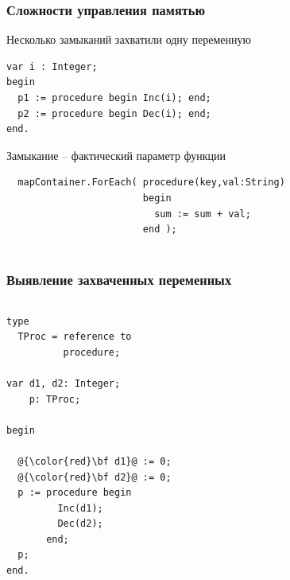 \documentclass[roman,12pt]{beamer}
\begin{document}
\begin{frame}[fragile]
  \frametitle{Сложности управления памятью}
 \begin{block}{Несколько замыканий захватили одну переменную}
   \begin{lstlisting}
var i : Integer;
begin
  p1 := procedure begin Inc(i); end;
  p2 := procedure begin Dec(i); end;
end.
   \end{lstlisting}
  \end{block}
 \begin{block}{Замыкание -- фактический параметр функции}
   \begin{lstlisting}
  mapContainer.ForEach( procedure(key,val:String)
                        begin
                          sum := sum + val;
                        end );
                         
    \end{lstlisting}
  \end{block}
\end{frame}

\begin{frame}[fragile]
  \frametitle{Выявление захваченных переменных}
  \begin{columns}[c]
    \column{2.2in}
      \begin{lstlisting}[escapechar=@,basicstyle=\scriptsize]
type 
  TProc = reference to
          procedure;

var d1, d2: Integer;
    p: TProc;

begin

  @{\color{red}\bf d1}@ := 0;
  @{\color{red}\bf d2}@ := 0;
  p := procedure begin
         Inc(d1);
         Dec(d2);
       end;
  p;
end.
     \end{lstlisting}
   \column{2.2in}
  \end{columns}
\end{frame}
\end{document}
